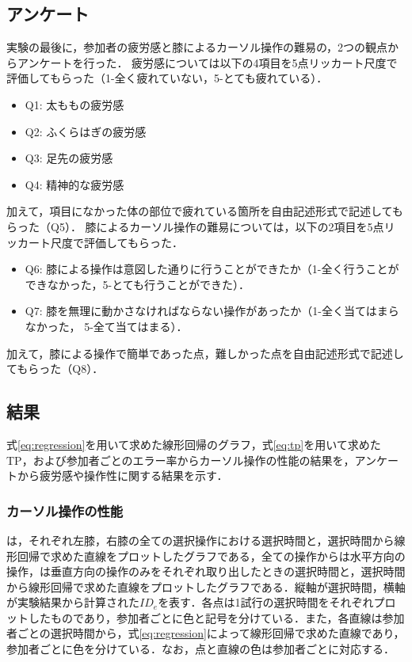 \documentclass[submit, techrep]{ipsj}
\begin{document}
\subsection{アンケート}
実験の最後に，参加者の疲労感と膝によるカーソル操作の難易の，2つの観点からアンケートを行った．
疲労感については以下の4項目を5点リッカート尺度で評価してもらった（1-全く疲れていない，5-とても疲れている）．
\begin{itemize}
	\item {Q1: }太ももの疲労感
	\item {Q2: }ふくらはぎの疲労感
	\item {Q3: }足先の疲労感
	\item {Q4: }精神的な疲労感
\end{itemize}
加えて，項目になかった体の部位で疲れている箇所を自由記述形式で記述してもらった（Q5）．
膝によるカーソル操作の難易については，以下の2項目を5点リッカート尺度で評価してもらった．
\begin{itemize}
	\item {Q6: }膝による操作は意図した通りに行うことができたか（1-全く行うことができなかった，5-とても行うことができた）．
	\item {Q7: }膝を無理に動かさなければならない操作があったか（1-全く当てはまらなかった， 5-全て当てはまる）．
\end{itemize}
加えて，膝による操作で簡単であった点，難しかった点を自由記述形式で記述してもらった（Q8）．
\subsection{結果}
式\ref{eq:regression}を用いて求めた線形回帰のグラフ，式\ref{eq:tp}を用いて求めたTP，および参加者ごとのエラー率からカーソル操作の性能の結果を，アンケートから疲労感や操作性に関する結果を示す．
\subsubsection{カーソル操作の性能}
は，それぞれ左膝，右膝の全ての選択操作における選択時間と，選択時間から線形回帰で求めた直線をプロットしたグラフである，全ての操作からは水平方向の操作，は垂直方向の操作のみをそれぞれ取り出したときの選択時間と，選択時間から線形回帰で求めた直線をプロットしたグラフである．縦軸が選択時間，横軸が実験結果から計算された$ID_e$を表す．各点は1試行の選択時間をそれぞれプロットしたものであり，参加者ごとに色と記号を分けている．また，各直線は参加者ごとの選択時間から，式\ref{eq:regression}によって線形回帰で求めた直線であり，参加者ごとに色を分けている．なお，点と直線の色は参加者ごとに対応する．
\end{document}
